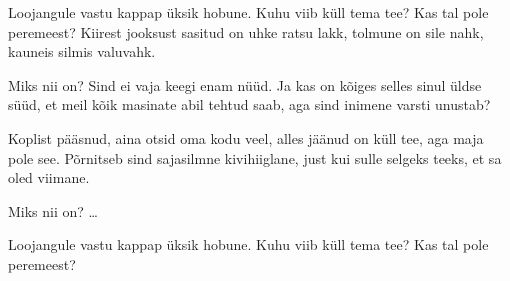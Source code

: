 Loojangule vastu kappap \"uksik hobune.
Kuhu viib k\"ull tema tee? Kas tal pole peremeest?
Kiirest jooksust sasitud on uhke ratsu lakk,
tolmune on sile nahk, kauneis silmis valuvahk.

Miks nii on? Sind ei vaja keegi enam n\"u\"ud.
Ja kas on k\~oiges selles sinul \"uldse s\"u\"ud,
et meil k\~oik masinate abil tehtud saab,
aga sind inimene varsti unustab?

Koplist p\"a\"asnud, aina otsid oma kodu veel,
alles j\"a\"anud on k\"ull tee, aga maja pole see.
P\~ornitseb sind sajasilmne kivihiiglane,
just kui sulle selgeks teeks, et sa oled viimane.

Miks nii on? \ldots

Loojangule vastu kappap \"uksik hobune.
Kuhu viib k\"ull tema tee? Kas tal pole peremeest?